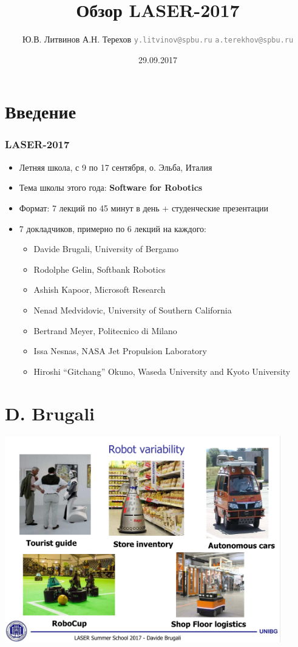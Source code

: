 \documentclass[xetex,mathserif,serif]{beamer}
\title{Обзор LASER-2017}
\author[Юрий Литвинов]{Ю.В. Литвинов \newline 
	А.Н. Терехов \newline
	\textcolor{gray}{\small\texttt{y.litvinov@spbu.ru}} \newline
	\textcolor{gray}{\small\texttt{a.terekhov@spbu.ru}}
}
\date{29.09.2017}
\begin{document}
	\frame{\titlepage}

	\section{Введение}

	\begin{frame}
		\frametitle{LASER-2017}
		\begin{itemize}
			\item Летняя школа, с 9 по 17 сентября, о. Эльба, Италия
			\item Тема школы этого года: \textbf{Software for Robotics}
			\item Формат: 7 лекций по 45 минут в день + студенческие презентации
			\item 7 докладчиков, примерно по 6 лекций на каждого:
			\begin{itemize}
				\item Davide Brugali, University of Bergamo
				\item Rodolphe Gelin, Softbank Robotics
				\item Ashish Kapoor, Microsoft Research
				\item Nenad Medvidovic, University of Southern California
				\item Bertrand Meyer, Politecnico di Milano
				\item Issa Nesnas, NASA Jet Propulsion Laboratory
				\item Hiroshi ``Gitchang'' Okuno, Waseda University and Kyoto University
			\end{itemize}
		\end{itemize}
	\end{frame}

	\section{D. Brugali}

	\begin{frame}
		\begin{center}
			\includegraphics[width=0.9\textwidth]{brugali1.png}
		\end{center}
	\end{frame}
\end{document}
